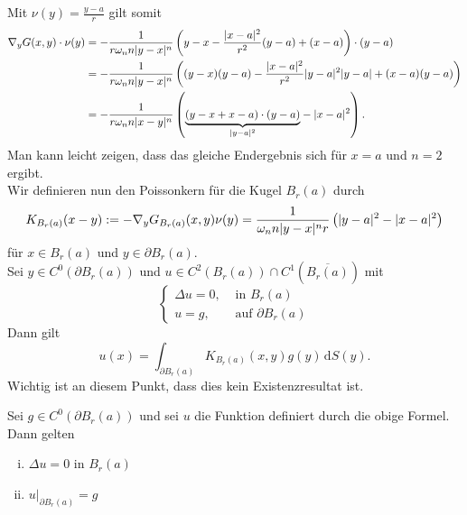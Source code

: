 	Mit $\nu(y)= \frac{y-a}{r}$ gilt somit
	\begin{align*}
		 \nabla_y G(x,y) \cdot \nu(y) &= - \frac{1}{r \omega_n n \lvert y-x\rvert^n} \left( y -x - \frac{\lvert x-a\rvert^2}{r^2}(y-a) + (x-a) \right) \cdot (y-a) \\
		 &= - \frac{1}{r \omega_n n \lvert y-x\rvert^n} \left( (y-x)(y-a) - \frac{\lvert x-a\rvert^2}{r^2} \lvert y-a\rvert^2 \lvert y-a\rvert + (x-a)(y-a) \right) \\
		 &= - \frac{1}{r \omega_n n \lvert x-y\rvert^n} \left( \underset{\lvert y-a\rvert^2}{\underbrace{(y-x+x-a) \cdot (y-a)}} - \lvert x-a\rvert^2 \right).
	\end{align*}
	Man kann leicht zeigen, dass das gleiche Endergebnis sich für $x=a$ und $n = 2$ ergibt. \\
	Wir definieren nun den Poissonkern für die Kugel $B_r(a)$ durch
	\[
		K_{B_r(a)}(x-y) := -  \nabla_y G_{B_r(a)}(x,y) \nu (y) = \frac{1}{\omega_n n \lvert y-x\rvert^n r} \left( \lvert y-a\rvert^2 - \lvert x-a\rvert^2 \right)
	\]
	für $x \in B_r(a)$ und $y \in \partial B_r(a)$. \\
	Sei $y \in C^0(\partial B_r(a))$ und $u \in C^2(B_r(a)) \cap C^1( \overline{B_r(a)})$ mit 
	\[
		\begin{cases}
			\Delta u = 0, &\text{ in }B_r(a)\\
			 u = g, &\text{ auf } \partial B_r(a)
		\end{cases}
	\]
	Dann gilt
	\[
		u(x) = \int_{\partial B_r(a) }^{} K_{B_r(a)}(x,y)g(y) \,\mathrm{d}S(y).
	\]
	Wichtig ist an diesem Punkt, dass dies kein Existenzresultat ist.
	\begin{satz}
		Sei $g \in C^0(\partial B_r(a))$ und sei $u$ die Funktion definiert durch die obige Formel. Dann gelten
		\begin{enumerate}[(i)]
			\item $ \Delta u = 0$ in $B_r(a)$
			\item $u  \Big|_{\partial B_r(a)}^{} = g$ 
		\end{enumerate}
	\end{satz}
